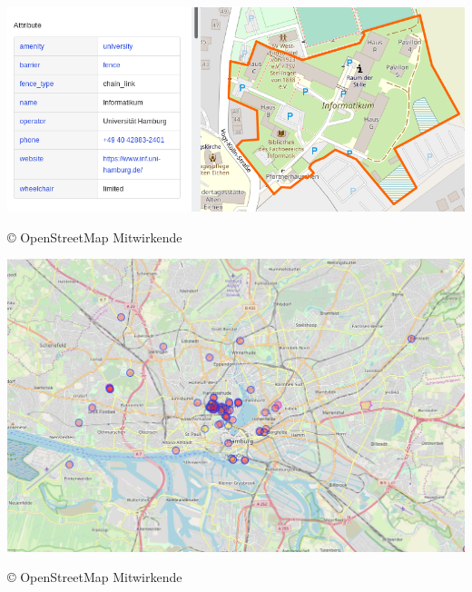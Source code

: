 \documentclass{beamer}
\begin{document}
	\begin{frame}
		\vspace{1cm}
		\vfill
		\includegraphics[width=\linewidth]{images/ikum}
		\begin{center}
			{\tiny \copyright{} OpenStreetMap Mitwirkende}
		\end{center}
		\vfill
	\end{frame}

	\begin{frame}
		\vspace{1cm}
		\vfill
		\includegraphics[width=\linewidth]{images/overpass-university}
		\begin{center}
			{\tiny \copyright{} OpenStreetMap Mitwirkende}
		\end{center}
		\vfill
	\end{frame}
\end{document}
